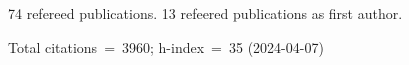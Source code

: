 74 refereed publications. 13 refeered publications as first author.

Total citations~=~3960; h-index~=~35 (2024-04-07)